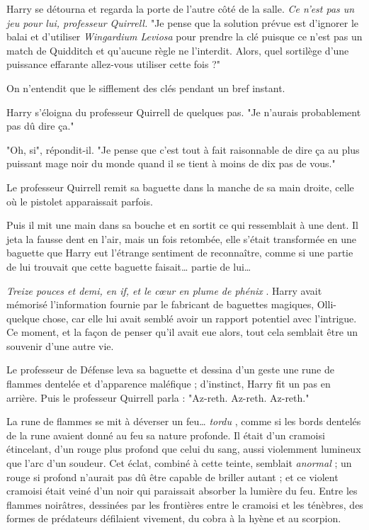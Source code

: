 Harry se détourna et regarda la porte de l'autre côté de la salle. \emph{Ce n'est pas un jeu pour lui, professeur Quirrell.}  "Je pense que la solution prévue est d'ignorer le balai et d'utiliser \emph{Wingardium Leviosa}  pour prendre la clé puisque ce n'est pas un match de Quidditch et qu'aucune règle ne l'interdit. Alors, quel sortilège d'une puissance effarante allez-vous utiliser cette fois ?"

On n'entendit que le sifflement des clés pendant un bref instant.

Harry s'éloigna du professeur Quirrell de quelques pas. "Je n'aurais probablement pas dû dire ça."

"Oh, si", répondit-il. "Je pense que c'est tout à fait raisonnable de dire ça au plus puissant mage noir du monde quand il se tient à moins de dix pas de vous."

Le professeur Quirrell remit sa baguette dans la manche de sa main droite, celle où le pistolet apparaissait parfois.

Puis il mit une main dans sa bouche et en sortit ce qui ressemblait à une dent. Il jeta la fausse dent en l'air, mais un fois retombée, elle s'était transformée en une baguette que Harry eut l'étrange sentiment de reconnaître, comme si une partie de lui trouvait que cette baguette faisait… partie de lui…

\emph{Treize pouces et demi, en if, et le cœur en plume de phénix} . Harry avait mémorisé l'information fournie par le fabricant de baguettes magiques, Olli-quelque chose, car elle lui avait semblé avoir un rapport potentiel avec l'intrigue. Ce moment, et la façon de penser qu'il avait eue alors, tout cela semblait être un souvenir d'une autre vie.

Le professeur de Défense leva sa baguette et dessina d'un geste une rune de flammes dentelée et d'apparence maléfique ; d'instinct, Harry fit un pas en arrière. Puis le professeur Quirrell parla : "Az-reth. Az-reth. Az-reth."

La rune de flammes se mit à déverser un feu… \emph{tordu} , comme si les bords dentelés de la rune avaient donné au feu sa nature profonde. Il était d'un cramoisi étincelant, d'un rouge plus profond que celui du sang, aussi violemment lumineux que l'arc d'un soudeur. Cet éclat, combiné à cette teinte, semblait \emph{anormal}  ; un rouge si profond n'aurait pas dû être capable de briller autant ; et ce violent cramoisi était veiné d'un noir qui paraissait absorber la lumière du feu. Entre les flammes noirâtres, dessinées par les frontières entre le cramoisi et les ténèbres, des formes de prédateurs défilaient vivement, du cobra à la hyène et au scorpion.

